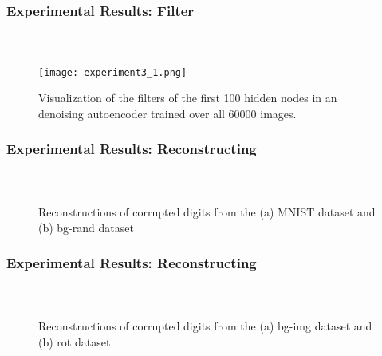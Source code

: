\begin{frame}[t]
	\frametitle{Experimental Results: Filter}
	\framesubtitle{~~}  %

	\begin{figure}[h] \centering
		\texttt{[image: experiment3\_1.png]}
		\caption{Visualization of the filters of the first 100 hidden nodes in an
		denoising autoencoder trained over all 60000 images.}
		\label{fig:experiment3_1}
	\end{figure}

\end{frame}
\begin{frame}[t]
	\frametitle{Experimental Results: Reconstructing}
	\framesubtitle{~~}  %

\begin{figure}
  \centering
  \caption{Reconstructions of corrupted digits from the (a) MNIST dataset and  (b) bg-rand dataset}
  \label{fig:reconstruct}
\end{figure}

\end{frame}


\begin{frame}[t]
	\frametitle{Experimental Results: Reconstructing}
	\framesubtitle{~~}  %

\begin{figure}
  \centering
  \caption{Reconstructions of corrupted digits from the (a) bg-img dataset and (b) rot dataset}
  \label{fig:reconstruct}
\end{figure}

\end{frame}

